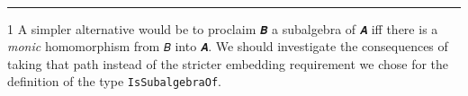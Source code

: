 \begin{code}
%
\\[\AgdaEmptyExtraSkip]%
\>[0]\AgdaSpace{}%
\AgdaModule{\AgdaUnderscore{}}\AgdaSpace{}%
\AgdaSymbol{\{}\AgdaSpace{}%
\AgdaSpace{}%
\AgdaSymbol{:}\AgdaSpace{}%
\AgdaSymbol{\}}\AgdaSpace{}%
\<%
\\
%
\\[\AgdaEmptyExtraSkip]%
\>[0][@{}l@{\AgdaIndent{0}}]%
\>[1]\AgdaSpace{}%
\AgdaSymbol{:}\AgdaSpace{}%
\AgdaSymbol{(}\AgdaSpace{}%
\AgdaSymbol{:}\AgdaSpace{}%
\AgdaSpace{}%
\AgdaSpace{}%
\AgdaSymbol{)\{}\AgdaSpace{}%
\AgdaSymbol{:}\AgdaSpace{}%
\AgdaSpace{}%
\AgdaSymbol{(}\AgdaSpace{}%
\AgdaSpace{}%
\AgdaSymbol{)}\AgdaSpace{}%
\AgdaSymbol{\}}\AgdaSpace{}%
\AgdaSpace{}%
\AgdaSpace{}%
\AgdaSpace{}%
\AgdaSpace{}%
\AgdaSpace{}%
\AgdaSpace{}%
\AgdaSpace{}%
\AgdaSpace{}%
\AgdaSpace{}%
\<%
\\
%
\>[1]\AgdaSpace{}%
\AgdaSpace{}%
\AgdaSymbol{\{}\AgdaSymbol{\}}\AgdaSpace{}%
\AgdaSpace{}%
\AgdaSymbol{=}\AgdaSpace{}%
\AgdaSpace{}%
\AgdaSpace{}%
\AgdaSymbol{\{}\AgdaSymbol{\}}\AgdaSpace{}%
\AgdaSymbol{(}\AgdaSpace{}%
\AgdaSpace{}%
\AgdaSymbol{)}\AgdaSpace{}%
\AgdaSpace{}%
\<%
\\
%
\\[\AgdaEmptyExtraSkip]%
\>[0]\<%
\end{code}

\begin{center}\rule{0.5\linewidth}{\linethickness}\end{center}

\protect\hypertarget{fn2}{}{1 A simpler alternative would be to proclaim
\texttt{𝑩} a subalgebra of \texttt{𝑨} iff there is a \emph{monic}
homomorphism from \texttt{𝐵} into \texttt{𝑨}. We should investigate the
consequences of taking that path instead of the stricter embedding
requirement we chose for the definition of the type
\texttt{IsSubalgebraOf}.}
